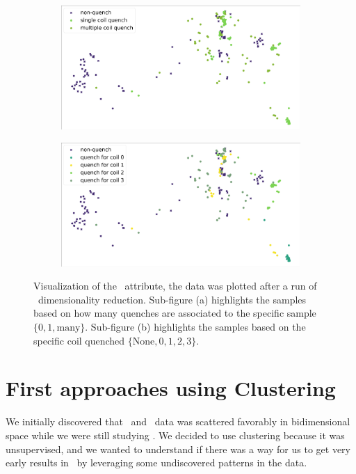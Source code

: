 \begin{figure}[!ht]
	\centering
	\begin{subfigure}{0.8\linewidth}
		\centering
		\includegraphics[width=\linewidth]{img/quench_dist_qlp/single_vs_multiple_Phi.png}
		\subcaption{}
	\end{subfigure}
	\begin{subfigure}{0.8\linewidth}
		\centering
		\includegraphics[width=\linewidth]{img/quench_dist_qlp_phi.png}
		\subcaption{}
	\end{subfigure}
	\caption{Visualization of the \phin\ attribute, the data was plotted after a run of \pca\
		dimensionality reduction. Sub-figure (a) highlights the samples based on how many quenches
		are associated to the specific sample $\{0, 1, \text{many}\}$. Sub-figure (b) highlights the
		samples based on the specific coil quenched $\{\text{None}, 0, 1, 2, 3\}$.}
	\label{fig:phi-coilq-dist}
\end{figure}

\section{First approaches using Clustering}
\label{sec:qlp-cluster}
We initially discovered that \an\ and \cnmod\ data was scattered favorably in bidimensional space
while we were still studying \qrp. We decided to use clustering because it was unsupervised,
and we wanted to understand if there was a way for us to get very early results in \qlp\ by
leveraging some undiscovered patterns in the data.

